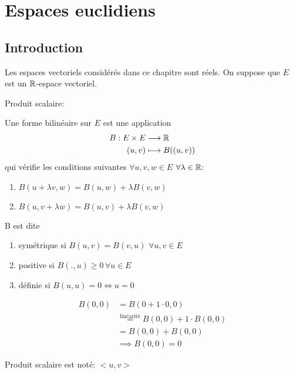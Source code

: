
\chapter{Espaces euclidiens}
\section{Introduction}
Les espaces vectoriels considérés dans ce chapitre sont réels. On suppose que $E$ est un $\mathbb{R}$-espace vectoriel.

Produit scalaire:
\begin{definition}
    Une forme bilinéaire sur $E$ est une application  
    \begin{align*}
        B: E \times E &\longrightarrow \mathbb{R} \\
        (u, v) &\longmapsto B((u, v))
    \end{align*}
    qui vérifie les conditions suivantes $\forall u, v, w \in E$ $\forall \lambda \in \mathbb{R}$:
    \begin{enumerate}
        \item $B(u + \lambda v, w) = B(u, w) + \lambda B(v, w)$
        \item  $B(u, v + \lambda w) = B(u, v) + \lambda B(v, w)$
    \end{enumerate}
    B est dite 
    \begin{enumerate}
        \item symétrique si $B(u, v) = B(v, u)$  $\forall u, v \in E$
        \item positive si $B(., u) \ge 0 \, \forall u \in E$
        \item définie si $B(u, u) = 0 \iff u = 0$
    \end{enumerate}
\end{definition}
\begin{explanation}
    \begin{align*}
        B(0, 0) &= B(0 + 1 \cdot 0, 0)\\
                &\overset{\text{linéarité}}{=} B(0, 0) + 1 \cdot B(0, 0) \\
                &= B(0,0) + B(0, 0)\\
                & \implies B(0, 0) = 0
    \end{align*}
\end{explanation}
\begin{notation}
   Produit scalaire est noté: $<u, v>$ 
\end{notation}
